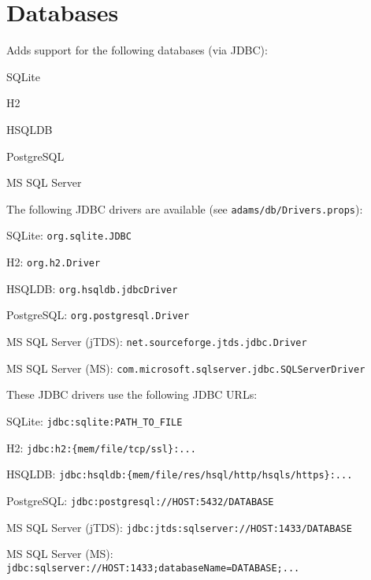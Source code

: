 \documentclass[a4paper]{book}
\begin{document}
\chapter{Databases}
Adds support for the following databases (via JDBC):
\begin{tight_itemize}
  \item SQLite\cite{sqlite}
  \item H2\cite{h2}
  \item HSQLDB\cite{hsqldb}
  \item PostgreSQL\cite{postgresql}
  \item MS SQL Server\cite{mssql}
\end{tight_itemize}
The following JDBC drivers are available (see \texttt{adams/db/Drivers.props}):
\begin{tight_itemize}
  \item SQLite: \verb|org.sqlite.JDBC|
  \item H2: \verb|org.h2.Driver|
  \item HSQLDB: \verb|org.hsqldb.jdbcDriver|
  \item PostgreSQL: \verb|org.postgresql.Driver|
  \item MS SQL Server (jTDS)\cite{jtds}: \verb|net.sourceforge.jtds.jdbc.Driver|
  \item MS SQL Server (MS)\cite{mssqljdbc}: \verb|com.microsoft.sqlserver.jdbc.SQLServerDriver|
\end{tight_itemize}
These JDBC drivers use the following JDBC URLs:
\begin{tight_itemize}
  \item SQLite\cite{sqlitexerial}: \verb|jdbc:sqlite:PATH_TO_FILE|
  \item H2: \verb|jdbc:h2:{mem/file/tcp/ssl}:...|
  \item HSQLDB: \verb|jdbc:hsqldb:{mem/file/res/hsql/http/hsqls/https}:...|
  \item PostgreSQL: \verb|jdbc:postgresql://HOST:5432/DATABASE|
  \item MS SQL Server (jTDS): \verb|jdbc:jtds:sqlserver://HOST:1433/DATABASE|
  \item MS SQL Server (MS): \verb|jdbc:sqlserver://HOST:1433;databaseName=DATABASE;...|
\end{tight_itemize}



\end{document}
